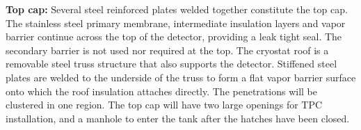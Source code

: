 %


\textbf{Top cap:}
%
Several steel reinforced plates welded together constitute the top cap. The stainless steel primary 
membrane, intermediate insulation layers and vapor barrier continue across the top of the detector, 
providing a leak tight seal. The secondary barrier is not used nor required at the top. The cryostat roof is 
a removable steel truss structure that also supports the detector. Stiffened steel plates are welded to the 
underside of the truss to form a flat vapor barrier surface onto which the roof insulation attaches directly. 
The penetrations will be clustered in one region. The top cap will have two large openings for TPC 
installation, and a manhole to enter the tank  after the 
hatches have been closed.


